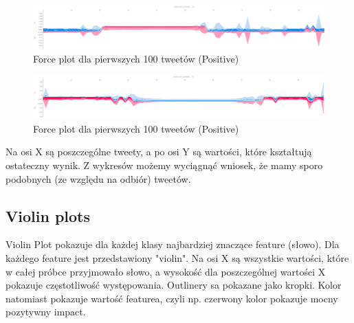 \documentclass{article}
\begin{document}
\begin{figure}[H]
    \centering
    \includegraphics[width=\textwidth]{assets/force_3_neutral.png}
    \caption{Force plot dla pierwszych 100 tweetów (Positive)}
\end{figure}

\begin{figure}[H]
    \centering
    \includegraphics[width=\textwidth]{assets/force_3_positive.png}
    \caption{Force plot dla pierwszych 100 tweetów (Positive)}
\end{figure}

\noindent Na osi X są poszczególne tweety, a po osi Y są wartości, które kształtują ostateczny wynik. Z wykresów możemy wyciągnąć wniosek, że mamy sporo podobnych (ze względu na odbiór) tweetów.

\subsection{Violin plots}

Violin Plot pokazuje dla każdej klasy najbardziej znaczące feature (słowo). Dla każdego feature jest przedstawiony "violin". Na osi X są wszystkie wartości, które w całej próbce przyjmowało słowo, a wysokość dla poszczególnej wartości X pokazuje częstotliwość występowania. Outlinery sa pokazane jako kropki. Kolor natomiast pokazuje wartość featurea, czyli np. czerwony kolor pokazuje mocny pozytywny impact.
\end{document}
